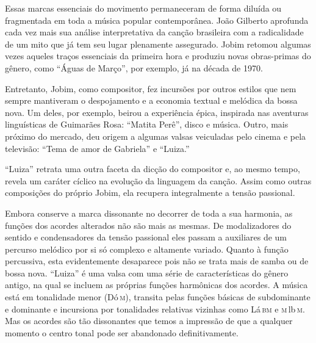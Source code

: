 Essas marcas essenciais do movimento permaneceram de forma diluída ou
fragmentada em toda a música popular contemporânea. João Gilberto
aprofunda cada vez mais sua análise interpretativa da canção brasileira
com a radicalidade de um mito que já tem seu lugar plenamente
assegurado. Jobim retomou algumas vezes aqueles traços essenciais da
primeira hora e produziu novas obras-primas do gênero, como ``Águas de
Março'', por exemplo, já na década de 1970.

Entretanto, Jobim, como compositor, fez incursões por outros estilos que
nem sempre mantiveram o despojamento e a economia textual e melódica da
bossa nova. Um deles, por exemplo, beirou a experiência épica, inspirada
nas aventuras linguísticas de Guimarães Rosa: ``Matita Perê'', disco e
música. Outro, mais próximo do mercado, deu origem a algumas valsas
veiculadas pelo cinema e pela televisão: ``Tema de amor de Gabriela'' e
``Luiza.''











``Luiza'' retrata uma outra faceta da dicção do compositor e, ao mesmo
tempo, revela um caráter cíclico na evolução da linguagem da canção.
Assim como outras composições do próprio Jobim, ela recupera
integralmente a tensão passional.

Embora conserve a marca dissonante no decorrer de toda a sua harmonia,
as funções dos acordes alterados não são mais as mesmas. De
modalizadores do sentido e condensadores da tensão passional eles passam
a auxiliares de um percurso melódico por si só complexo e altamente
variado. Quanto à função percussiva, esta evidentemente desaparece pois
não se trata mais de samba ou de bossa nova. ``Luiza'' é uma valsa com uma
série de características do gênero antigo, na qual se incluem as
próprias funções harmônicas dos acordes. A música está em tonalidade
menor (Dó\,\textsc{m}), transita pelas funções básicas de subdominante e dominante
e incursiona por tonalidades relativas vizinhas como Lá\,\textsc{bm} e \textsc{m}\,lb\,\textsc{m}. Mas os
acordes são tão dissonantes que temos a impressão de que a qualquer
momento o centro tonal pode ser abandonado definitivamente.

